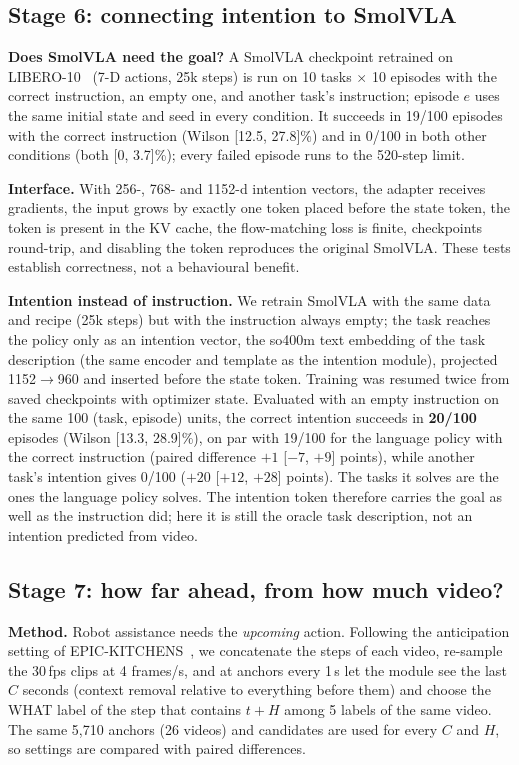 \documentclass[conference,a4paper]{IEEEtran}
\begin{document}
\subsection{Stage 6: connecting intention to SmolVLA}
\textbf{Does SmolVLA need the goal?} A SmolVLA checkpoint retrained on LIBERO-10~\cite{liu2023libero} (7-D actions, 25k steps) is run on 10 tasks $\times$ 10 episodes with the correct instruction, an empty one, and another task's instruction; episode $e$ uses the same initial state and seed in every condition. It succeeds in 19/100 episodes with the correct instruction (Wilson [12.5, 27.8]\%) and in 0/100 in both other conditions (both [0, 3.7]\%); every failed episode runs to the 520-step limit.

\textbf{Interface.} With 256-, 768- and 1152-d intention vectors, the adapter receives gradients, the input grows by exactly one token placed before the state token, the token is present in the KV cache, the flow-matching loss is finite, checkpoints round-trip, and disabling the token reproduces the original SmolVLA. These tests establish correctness, not a behavioural benefit.

\textbf{Intention instead of instruction.} We retrain SmolVLA with the same data and recipe (25k steps) but with the instruction always empty; the task reaches the policy only as an intention vector, the so400m text embedding of the task description (the same encoder and template as the intention module), projected 1152$\rightarrow$960 and inserted before the state token. Training was resumed twice from saved checkpoints with optimizer state. Evaluated with an empty instruction on the same 100 (task, episode) units, the correct intention succeeds in \textbf{20/100} episodes (Wilson [13.3, 28.9]\%), on par with 19/100 for the language policy with the correct instruction (paired difference $+1$ [$-7$, $+9$] points), while another task's intention gives 0/100 ($+20$ [$+12$, $+28$] points). The tasks it solves are the ones the language policy solves. The intention token therefore carries the goal as well as the instruction did; here it is still the oracle task description, not an intention predicted from video.

\subsection{Stage 7: how far ahead, from how much video?}
\textbf{Method.} Robot assistance needs the \emph{upcoming} action. Following the anticipation setting of EPIC-KITCHENS~\cite{damen2018epic,furnari2021rulstm}, we concatenate the steps of each video, re-sample the 30\,fps clips at 4 frames/s, and at anchors every 1\,s let the module see the last $C$ seconds (context removal relative to everything before them) and choose the WHAT label of the step that contains $t+H$ among 5 labels of the same video. The same 5,710 anchors (26 videos) and candidates are used for every $C$ and $H$, so settings are compared with paired differences.
\end{document}
